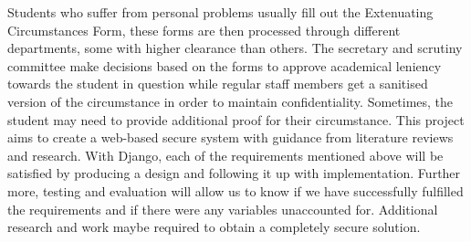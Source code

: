 \documentclass[../main.tex]{subfiles}
\begin{document}
\raggedright
Students who suffer from personal problems usually fill out the Extenuating Circumstances Form, these forms are then processed through different departments, some with higher clearance than others. The secretary and scrutiny committee make decisions based on the forms to approve academical leniency towards the student in question while regular staff members get a sanitised version of the circumstance in order to maintain confidentiality. Sometimes, the student may need to provide additional proof for their circumstance. This project aims to create a web-based secure system with guidance from literature reviews and research. With Django, each of the requirements mentioned above will be satisfied by producing a design and following it up with implementation. Further more, testing and evaluation will allow us to know if we have successfully fulfilled the requirements and if there were any variables unaccounted for. Additional research and work maybe required to obtain a completely secure solution. 
\end{document}
